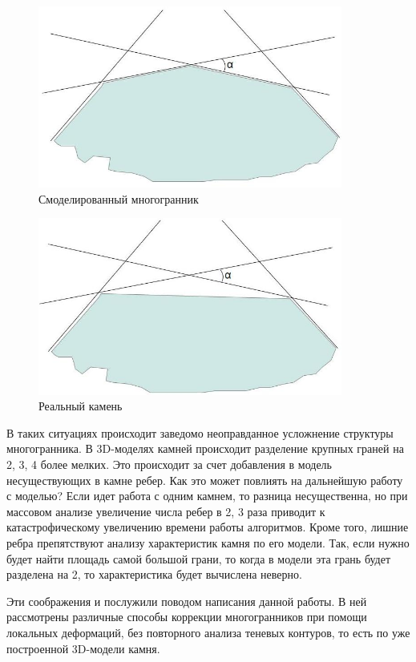 \documentclass[a4paper,12pt, titlepage]{article}
\begin{document}
\begin{flushleft}
  \begin{figure}[h]
    \includegraphics[clip, width=10cm]{img/contour-1.jpg}
    \caption{Смоделированный многогранник}\label{poly-model}
  \end{figure}
  \begin{figure}[h]
    \includegraphics[clip, width=10cm]{img/contour-2.jpg}
    \caption{Реальный камень}\label{poly-real} 
  \end{figure}
\end{flushleft}
\begin{flushleft}
  В таких ситуациях происходит заведомо неоправданное усложнение структуры многогранника. В 3D-моделях
камней происходит разделение крупных граней на 2, 3, 4 более мелких. Это происходит за счет добавления 
в модель несуществующих в камне ребер. Как это может повлиять на дальнейшую работу с моделью? Если идет работа 
с одним камнем, то разница несущественна, но при массовом анализе увеличение числа ребер в 2, 3 раза приводит
к катастрофическому увеличению времени работы алгоритмов. Кроме того, лишние ребра препятствуют анализу характеристик
камня по его модели. Так, если нужно будет найти площадь самой большой грани, то когда в модели эта грань будет 
разделена на 2, то характеристика будет вычислена неверно.
\end{flushleft}
\begin{flushleft}
  Эти соображения и послужили поводом написания данной работы. В ней рассмотрены различные способы коррекции
многогранников при помощи локальных деформаций, без повторного анализа теневых контуров, то есть по уже 
построенной 3D-модели камня.
\end{flushleft}
\end{document}
